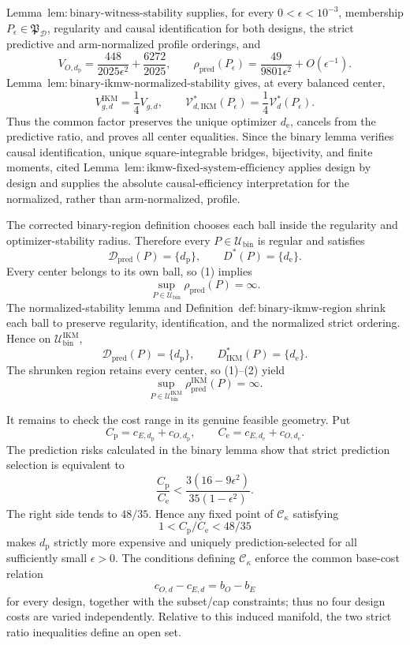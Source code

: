 Lemma~\(\mathrm{lem{:}binary\text{-}witness\text{-}stability}\) supplies, for every \(0<\epsilon<10^{-3}\), membership \(P_\epsilon\in\mathfrak P_{\mathcal D}\), regularity and causal identification for both designs, the strict predictive and arm-normalized profile orderings, and
\[
V_{O,d_{\mathrm p}}
=\frac{448}{2025\epsilon^2}+\frac{6272}{2025},
\qquad
\rho_{\mathrm{pred}}(P_\epsilon)
=\frac{49}{9801\epsilon^2}+O(\epsilon^{-1}). \tag{1}
\]
Lemma~\(\mathrm{lem{:}binary\text{-}ikmw\text{-}normalized\text{-}stability}\) gives, at every balanced center,
\[
V_{g,d}^{\mathrm{IKM}}=\frac14V_{g,d},\qquad
\mathcal V_{d,\mathrm{IKM}}^*(P_\epsilon)
=\frac14\mathcal V_d^*(P_\epsilon). \tag{2}
\]
Thus the common factor preserves the unique optimizer \(d_{\mathrm e}\), cancels from the predictive ratio, and proves all center equalities. Since the binary lemma verifies causal identification, unique square-integrable bridges, bijectivity, and finite moments, cited Lemma~\(\mathrm{lem{:}ikmw\text{-}fixed\text{-}system\text{-}efficiency}\) applies design by design and supplies the absolute causal-efficiency interpretation for the normalized, rather than arm-normalized, profile.

The corrected binary-region definition chooses each ball inside the regularity and optimizer-stability radius. Therefore every \(P\in\mathcal U_{\mathrm{bin}}\) is regular and satisfies
\[
\mathcal D_{\mathrm{pred}}(P)=\{d_{\mathrm p}\},
\qquad D^*(P)=\{d_{\mathrm e}\}.
\]
Every center belongs to its own ball, so (1) implies
\[
\sup_{P\in\mathcal U_{\mathrm{bin}}}\rho_{\mathrm{pred}}(P)=\infty. \tag{3}
\]
The normalized-stability lemma and Definition~\(\mathrm{def{:}binary\text{-}ikmw\text{-}region}\) shrink each ball to preserve regularity, identification, and the normalized strict ordering. Hence on \(\mathcal U_{\mathrm{bin}}^{\mathrm{IKM}}\),
\[
\mathcal D_{\mathrm{pred}}(P)=\{d_{\mathrm p}\},\qquad
D_{\mathrm{IKM}}^*(P)=\{d_{\mathrm e}\}.
\]
The shrunken region retains every center, so (1)--(2) yield
\[
\sup_{P\in\mathcal U_{\mathrm{bin}}^{\mathrm{IKM}}}
\rho_{\mathrm{pred}}^{\mathrm{IKM}}(P)=\infty. \tag{4}
\]

It remains to check the cost range in its genuine feasible geometry. Put
\[
C_{\mathrm p}=c_{E,d_{\mathrm p}}+c_{O,d_{\mathrm p}},
\qquad
C_{\mathrm e}=c_{E,d_{\mathrm e}}+c_{O,d_{\mathrm e}}.
\]
The prediction risks calculated in the binary lemma show that strict prediction selection is equivalent to
\[
\frac{C_{\mathrm p}}{C_{\mathrm e}}
<\frac{3(16-9\epsilon^2)}{35(1-\epsilon^2)}. \tag{5}
\]
The right side tends to \(48/35\). Hence any fixed point of \(\mathcal C_\kappa\) satisfying
\[
1<C_{\mathrm p}/C_{\mathrm e}<48/35
\]
makes \(d_{\mathrm p}\) strictly more expensive and uniquely prediction-selected for all sufficiently small \(\epsilon>0\). The conditions defining \(\mathcal C_\kappa\) enforce the common base-cost relation
\[
c_{O,d}-c_{E,d}=b_O-b_E
\]
for every design, together with the subset/cap constraints; thus no four design costs are varied independently. Relative to this induced manifold, the two strict ratio inequalities define an open set.


